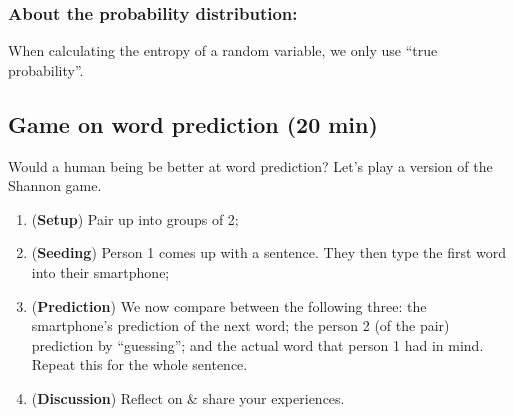 \documentclass[12pt]{article}
\theoremstyle{definition}
\theoremstyle{plain}
\begin{document}
\subsubsection{About the probability distribution:}
When calculating the entropy of a random variable, we only use ``true
probability''.



\subsection{Game on word prediction (20 min)}
Would a human being be better at word prediction? Let's play a version of the Shannon game.
\begin{enumerate}[{Stage} 1]
    \item (\textbf{Setup}) Pair up into groups of 2;
    \item (\textbf{Seeding}) Person 1 comes up with a sentence. They then type the
        first word into their smartphone;
    \item (\textbf{Prediction}) We now compare between the following three: the smartphone's prediction of the next word; the person 2 (of the pair) prediction by ``guessing''; and the actual word that person 1 had in mind. Repeat this for the whole sentence.
    \item (\textbf{Discussion}) Reflect on & share your experiences.
\end{enumerate}
\end{document}
